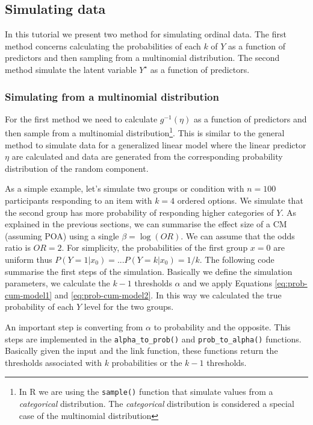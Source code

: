 \documentclass[
  man,floatsintext]{apa6}
\begin{document}
\subsection{Simulating data}\label{simulating-data}

In this tutorial we present two method for simulating ordinal data. The first method concerns calculating the probabilities of each \(k\) of \(Y\) as a function of predictors and then sampling from a multinomial distribution. The second method simulate the latent variable \(Y^\star\) as a function of predictors.

\subsubsection{Simulating from a multinomial distribution}\label{simulating-from-a-multinomial-distribution}

For the first method we need to calculate \(g^{-1}(\eta)\) as a function of predictors and then sample from a multinomial distribution\footnote{In R we are using the \texttt{sample()} function that simulate values from a \emph{categorical} distribution. The \emph{categorical} distribution is considered a special case of the multinomial distribution}. This is similar to the general method to simulate data for a generalized linear model where the linear predictor \(\eta\) are calculated and data are generated from the corresponding probability distribution of the random component.

As a simple example, let's simulate two groups or condition with \(n = 100\) participants responding to an item with \(k = 4\) ordered options. We simulate that the second group has more probability of responding higher categories of \(Y\). As explained in the previous sections, we can summarise the effect size of a CM (assuming POA) using a single \(\beta = \log(OR)\). We can assume that the odds ratio is \(OR = 2\). For simplicity, the probabilities of the first group \(x = 0\) are uniform thus \(P(Y = 1|x_0) = ... P(Y = k|x_0) = 1/k\). The following code summarise the first steps of the simulation. Basically we define the simulation parameters, we calculate the \(k - 1\) thresholds \(\alpha\) and we apply Equations \eqref{eq:prob-cum-model1} and \eqref{eq:prob-cum-model2}. In this way we calculated the true probability of each \(Y\) level for the two groups.

An important step is converting from \(\alpha\) to probability and the opposite. This steps are implemented in the \texttt{alpha\_to\_prob()} and \texttt{prob\_to\_alpha()} functions. Basically given the input and the link function, these functions return the thresholds associated with \(k\) probabilities or the \(k - 1\) thresholds.
\end{document}
